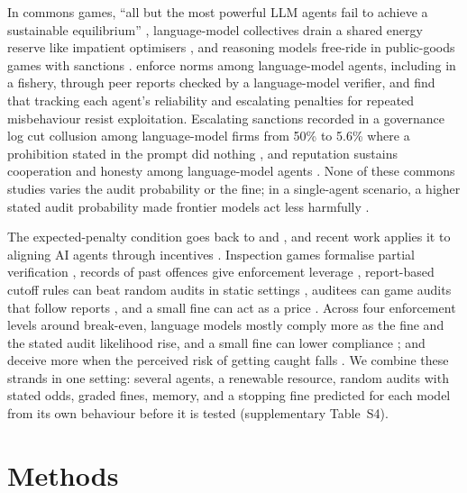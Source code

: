 In commons games, ``all but the most powerful LLM agents fail to achieve a sustainable equilibrium'' \citep{piatti2024cooperate}, language-model collectives drain a shared energy reserve like impatient optimisers \citep{bracale2026draining}, and reasoning models free-ride in public-goods games with sanctions \citep{guzman2025corrupted}. \citet{ye2026norm} enforce norms among language-model agents, including in a fishery, through peer reports checked by a language-model verifier, and find that tracking each agent's reliability and escalating penalties for repeated misbehaviour resist exploitation. Escalating sanctions recorded in a governance log cut collusion among language-model firms from 50\% to 5.6\% where a prohibition stated in the prompt did nothing \citep{bracale2026institutional}, and reputation sustains cooperation and honesty among language-model agents \citep{ren2026repunet,yang2026carp}. None of these commons studies varies the audit probability or the fine; in a single-agent scenario, a higher stated audit probability made frontier models act less harmfully \citep{konuganti2026deterrence}.

The expected-penalty condition goes back to \citet{becker1968crime} and \citet{allingham1972income}, and recent work applies it to aligning AI agents through incentives \citep{agarwal2026incentives}. Inspection games formalise partial verification \citep{avenhaus2002inspection}, records of past offences give enforcement leverage \citep{harrington1988enforcement}, report-based cutoff rules can beat random audits in static settings \citep{reinganum1985income}, auditees can game audits that follow reports \citep{burnat2026auditee}, and a small fine can act as a price \citep{gneezy2000fine}. Across four enforcement levels around break-even, language models mostly comply more as the fine and the stated audit likelihood rise, and a small fine can lower compliance \citep{okamoto2026why}; and deceive more when the perceived risk of getting caught falls \citep{scheurer2023strategic}. We combine these strands in one setting: several agents, a renewable resource, random audits with stated odds, graded fines, memory, and a stopping fine predicted for each model from its own behaviour before it is tested (supplementary Table~S4).

\section{Methods}
\label{sec:setting}

